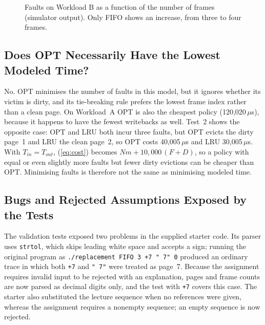 \documentclass[conference,a4paper]{IEEEtran}
\newcommand{\code}[1]{\texttt{#1}}
\begin{document}
\begin{figure}[!tb]
\centering
{}
\caption{Faults on Workload B as a function of the number of frames (simulator output). Only FIFO shows an increase, from three to four frames.}
\label{fig:belady}
\end{figure}

\subsection{Does OPT Necessarily Have the Lowest Modeled Time?}
No. OPT minimises the number of faults in this model, but it ignores whether its victim is dirty, and its tie-breaking rule prefers the lowest frame index rather than a clean page. On Workload~A OPT is also the cheapest policy (120{,}020\,$\mu$s), because it happens to have the fewest writebacks as well. Test~2 shows the opposite case: OPT and LRU both incur three faults, but OPT evicts the dirty page~1 and LRU the clean page~2, so OPT costs 40{,}005\,$\mu$s and LRU 30{,}005\,$\mu$s. With $T_{in} = T_{out}$, (\ref{eq:cost}) becomes $N m + 10{,}000\,(F + D)$, so a policy with equal or even slightly more faults but fewer dirty evictions can be cheaper than OPT. Minimising faults is therefore not the same as minimising modeled time.

\subsection{Bugs and Rejected Assumptions Exposed by the Tests}
The validation tests exposed two problems in the supplied starter code. Its parser uses \code{strtol}, which skips leading white space and accepts a sign; running the original program as \code{./replacement FIFO 3 +7 " 7" 0} produced an ordinary trace in which both \code{+7} and \code{" 7"} were treated as page~7. Because the assignment requires invalid input to be rejected with an explanation, pages and frame counts are now parsed as decimal digits only, and the test with \code{+7} covers this case. The starter also substituted the lecture sequence when no references were given, whereas the assignment requires a nonempty sequence; an empty sequence is now rejected.
\end{document}
